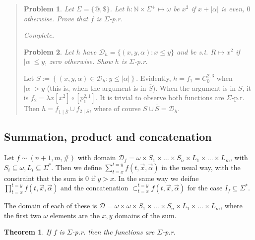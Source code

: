 \documentclass[a4paper, 12pt]{article}
\newtheorem{problem}{Problem}
\newtheorem{theorem}{Theorem}
\newtheorem{problem}{Problem}
\newtheorem{theorem}{Theorem}
\begin{document}
\small
\begin{quote}

\begin{problem}
    Let $\Sigma = \{@, \$\}$. Let $h : \mathbb{N} \times  \Sigma^{+} \mapsto \omega$
    be $x^2$ if $x + |\alpha|$ is even, $0$ otherwise. Prove that $f$ is
    $\Sigma$-p.r.
\end{problem}

\textit{Complete.}


\begin{problem}
    Let $h$ have $\mathcal{D}_{h} = \{(x, y, \alpha) : x \leq y\}$ and be s.t.
    $R \mapsto x^2$ if $|\alpha| \leq y$, zero otherwise. Show $h$ is $\Sigma$-p.r.
\end{problem}

Let $S := \left\{ (x, y, \alpha) \in \mathcal{D}_h : y \leq |\alpha| \right\}$.
Evidently, $h = f_1 = C_{0}^{2, 3}$ when $|\alpha| > y$ (this is, when the argument is
in $\overline{S}$). When the argument is in $S$, it is $f_2 = \lambda x[x^2] \circ
[p_1^{2, 1}]$. It is trivial to observe both functions are $\Sigma$-p.r. Then $h
= f_{1\mid \overline{S}} \cup f_{2\mid S}$, where of course $S \cup \overline{S}
= \mathcal{D}_h$.

\end{quote}
\normalsize


\subsection{Summation, product and concatenation}

Let $f \sim (n + 1, m, \#)$ with domain $\mathcal{D}_f = \omega \times  S_1 \times \ldots
\times  S_n \times L_1 \times \ldots \times   L_m$, with $S_i \subseteq \omega, L_i \subseteq
\Sigma^{*}$. Then we define $\sum_{t =
x}^{t = y} f(t, \overrightarrow{x}, \overrightarrow{\alpha})$ in the usual way,
with the constraint that the sum is $0$ if $y > x$. In the same way we deifne
$\prod_{t = x}^{t = y} f(t, \overrightarrow{x}, \overrightarrow{\alpha})$ and
the concatenation $\mathop{\subset}_{t=x}^{t=y}f(t, \overrightarrow{x},
\overrightarrow{\alpha})$ for the case $I_f \subseteq \Sigma^{*}$.

The domain of each of these is $\mathcal{D} = \omega \times  \omega \times S_1
\times\ldots \times S_n \times L_1 \times  \ldots \times L_m$, where the first
two $\omega$ elements are the $x, y$ domains of the sum.

\begin{theorem}
    If $f$ is $\Sigma$-p.r. then the functions are $\Sigma$-p.r.
\end{theorem}
\end{document}
